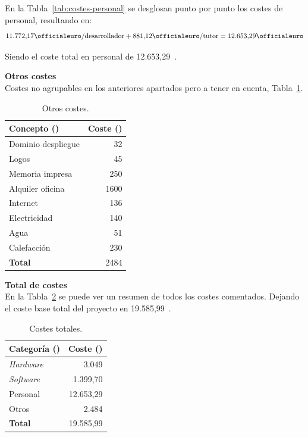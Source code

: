 En la Tabla~\ref{tab:costes-personal} se desglosan punto por punto los costes de personal, resultando en:
\[ \text{11.772,17\officialeuro/desarrollador} + \text{881,12\officialeuro/tutor} =  \text{12.653,29\officialeuro}\]

Siendo el coste total en personal de  12.653,29~\officialeuro{}.

\textbf{Otros costes}\\
Costes no agrupables en los anteriores apartados pero a tener en cuenta, Tabla~\ref{tab:costes-otros}.

\begin{table}[H]
\centering
\begin{tabular}{lr}
	\toprule
	\textbf{Concepto (\officialeuro)} & \textbf{Coste (\officialeuro)} \\
	\midrule
	Dominio despliegue & 32 \\
	Logos & 45 \\
	Memoria impresa & 250 \\
	Alquiler oficina & 1600 \\
	Internet & 136\\
	Electricidad & 140 \\
	Agua & 51\\
	Calefacción & 230 \\
	\midrule
	\textbf{Total} & 2484 \\
	\bottomrule
\end{tabular}
\caption{Otros costes.}\label{tab:costes-otros}
\end{table}

\textbf{Total de  costes}\\
En la Tabla~\ref{tab:costes-totales} se puede ver un resumen de todos los costes comentados. Dejando el coste base total del proyecto en 19.585,99~\officialeuro.

\begin{table}[H]
\centering
\begin{tabular}{lr}
	\toprule
	\textbf{Categoría (\officialeuro)} & \textbf{Coste (\officialeuro)} \\
	\midrule
	\textit{Hardware} & 3.049 \\
	\textit{Software} & 1.399,70 \\
	Personal & 12.653,29 \\
	Otros & 2.484 \\
	\midrule
	\textbf{Total} & 19.585,99 \\
	\bottomrule
\end{tabular}
\caption{Costes totales.}\label{tab:costes-totales}
\end{table}


